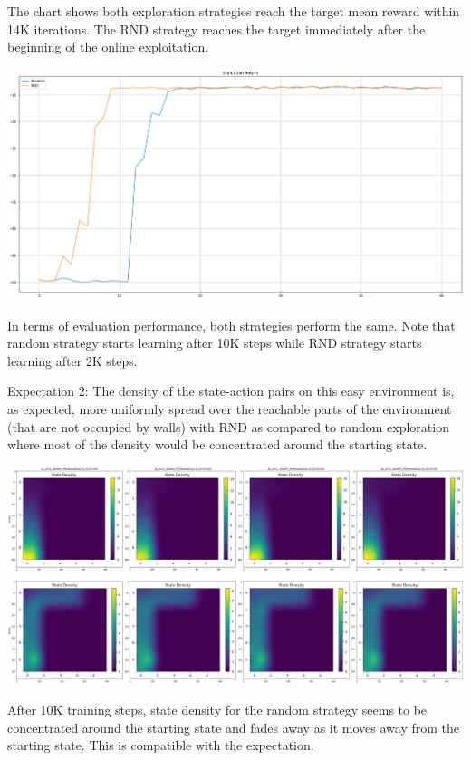 \documentclass[11pt]{article}
\begin{document}
    The chart shows both exploration strategies reach the target mean reward within 14K iterations.
    The RND strategy reaches the target immediately after the beginning of the online exploitation.

    \hspace*{-0.6in}
    \includegraphics[scale=0.30]{p1/q1-easy-eval-compare}

    In terms of evaluation performance, both strategies perform the same.
    Note that random strategy starts learning after 10K steps while RND strategy starts learning after 2K steps.



    Expectation 2: The density of the state-action pairs on this easy environment is, as expected, more uniformly spread over the reachable parts of the environment (that are not occupied by walls) with RND as compared to random exploration where most of the density would be concentrated around the starting state.

    \hspace*{-0.6in}
    \includegraphics[scale=0.20]{p1/q1-easy-state-density-random}

    After 10K training steps, state density for the random strategy seems to be concentrated around the starting state and fades away as it moves away from the starting state.
    This is compatible with the expectation.
\end{document}

